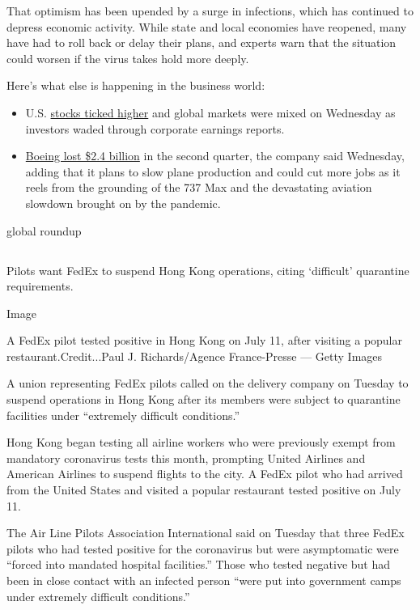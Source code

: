 That optimism has been upended by a surge in infections, which has
continued to depress economic activity. While state and local economies
have reopened, many have had to roll back or delay their plans, and
experts warn that the situation could worsen if the virus takes hold
more deeply.

Here's what else is happening in the business world:

\begin{itemize}
\item
  U.S.
  \href{https://www.nytimes.com/live/2020/07/29/business/stock-market-today-coronavirus}{stocks
  ticked higher} and global markets were mixed on Wednesday as investors
  waded through corporate earnings reports.
\item
  \href{https://www.nytimes.com/live/2020/07/29/business/stock-market-today-coronavirus}{Boeing
  lost \$2.4 billion} in the second quarter, the company said Wednesday,
  adding that it plans to slow plane production and could cut more jobs
  as it reels from the grounding of the 737 Max and the devastating
  aviation slowdown brought on by the pandemic.
\end{itemize}

global roundup

\hypertarget{-11}{%
\subsection{}\label{-11}}

Pilots want FedEx to suspend Hong Kong operations, citing `difficult'
quarantine requirements.

Image

A FedEx pilot tested positive in Hong Kong on July 11, after visiting a
popular restaurant.Credit...Paul J. Richards/Agence France-Presse ---
Getty Images

A union representing FedEx pilots called on the delivery company on
Tuesday to suspend operations in Hong Kong after its members were
subject to quarantine facilities under ``extremely difficult
conditions.''

Hong Kong began testing all airline workers who were previously exempt
from mandatory coronavirus tests this month, prompting United Airlines
and American Airlines to suspend flights to the city. A FedEx pilot who
had arrived from the United States and visited a popular restaurant
tested positive on July 11.

The Air Line Pilots Association International said on Tuesday that three
FedEx pilots who had tested positive for the coronavirus but were
asymptomatic were ``forced into mandated hospital facilities.'' Those
who tested negative but had been in close contact with an infected
person ``were put into government camps under extremely difficult
conditions.''

